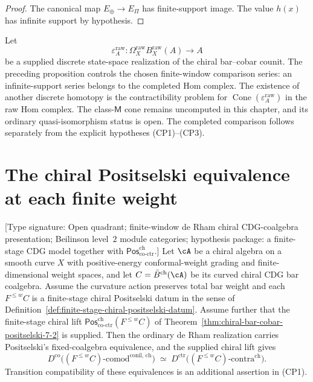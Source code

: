 \begin{proof}
The canonical map \(E_\oplus\to E_\Pi\) has finite-support image.
The value \(h(x)\) has infinite support by hypothesis.
\end{proof}

\begin{remark}
\label{rem:class-m-raw-comparison-open}
Let
\[
 \varepsilon_A^{\mathrm{raw}}\colon
 \Omega_X^{\mathrm{raw}}B_X^{\mathrm{raw}}(A)\longrightarrow A
\]
be a supplied discrete state-space realization of the chiral
bar--cobar counit.  The preceding proposition controls the chosen
finite-window comparison series: an infinite-support series belongs
to the completed Hom complex.  The existence of another discrete
homotopy is the contractibility problem for
\(\operatorname{Cone}(\varepsilon_A^{\mathrm{raw}})\) in the raw Hom
complex.  The class-\(\mathsf M\) cone remains uncomputed in this
chapter, and its ordinary quasi-isomorphism status is open.  The
completed comparison follows separately from
the explicit hypotheses \textup{(CP1)--(CP3)}.
\end{remark}

\section{The chiral Positselski equivalence at each finite weight}
\label{sec:chiral-positselski-at-each-weight}

\begin{theorem}
\label{thm:chiral-positselski-at-each-weight}
\textup{[Type signature: Open quadrant; finite-window de Rham chiral
CDG-coalgebra presentation; Beilinson level~\(2\) module categories;
hypothesis package: a finite-stage CDG model together with
\(\mathsf{Pos}^{\mathrm{ch}}_{\mathrm{co\text{-}ctr}}\).]}
Let $\cA$ be a chiral algebra on a smooth curve $X$ with
positive-energy conformal-weight grading and finite-dimensional
weight spaces, and let
$C = \bar{B}^{\mathrm{ch}}(\cA)$ be its curved chiral CDG bar
coalgebra.  Assume the curvature action preserves total bar weight and
each \(F^{\leq w}C\) is a finite-stage chiral Positselski datum in the
sense of Definition~\ref{def:finite-stage-chiral-positselski-datum}.
Assume further that the finite-stage chiral lift
\(\mathsf{Pos}^{\mathrm{ch}}_{\mathrm{co\text{-}ctr}}
(F^{\leq w}C)\) of
Theorem~\ref{thm:chiral-bar-cobar-positselski-7-2} is supplied.
Then the ordinary de Rham realization carries Positselski's
fixed-coalgebra equivalence, and the supplied chiral lift gives
\begin{equation}\label{eq:chiral-positselski-at-each-weight}
D^{\mathrm{co}}\bigl((F^{\leq w}C)\text{-}
 \mathrm{comod}^{\mathrm{conil,\,ch}}\bigr)
\;\simeq\;
D^{\mathrm{ctr}}\bigl((F^{\leq w}C)\text{-}
\mathrm{contra}^{\mathrm{ch}}\bigr).
\end{equation}
Transition compatibility of these equivalences is an additional
assertion in \textup{(CP1)}.
\end{theorem}

